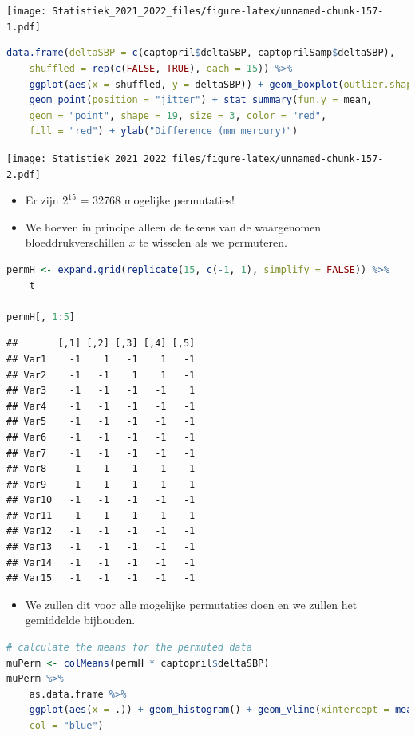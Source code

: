 \documentclass[
  12pt,dutch,coursenotes]{book}
\providecommand{\tightlist}{%
  \setlength{\itemsep}{0pt}\setlength{\parskip}{0pt}}
\theoremstyle{definition}
\theoremstyle{definition}
\theoremstyle{definition}
\theoremstyle{definition}
\theoremstyle{remark}
\begin{document}
\texttt{[image: Statistiek\_2021\_2022\_files/figure-latex/unnamed-chunk-157-1.pdf]}

\begin{lstlisting}[language=R]
data.frame(deltaSBP = c(captopril$deltaSBP, captoprilSamp$deltaSBP),
    shuffled = rep(c(FALSE, TRUE), each = 15)) %>%
    ggplot(aes(x = shuffled, y = deltaSBP)) + geom_boxplot(outlier.shape = NA) +
    geom_point(position = "jitter") + stat_summary(fun.y = mean,
    geom = "point", shape = 19, size = 3, color = "red",
    fill = "red") + ylab("Difference (mm mercury)")
\end{lstlisting}

\texttt{[image: Statistiek\_2021\_2022\_files/figure-latex/unnamed-chunk-157-2.pdf]}

\begin{itemize}
\tightlist
\item
  Er zijn \(2^{15}\) = 32768 mogelijke permutaties!
\item
  We hoeven in principe alleen de tekens van de waargenomen bloeddrukverschillen \(x\) te wisselen als we permuteren.
\end{itemize}

\begin{lstlisting}[language=R]
permH <- expand.grid(replicate(15, c(-1, 1), simplify = FALSE)) %>%
    t

permH[, 1:5]
\end{lstlisting}

\begin{lstlisting}
##       [,1] [,2] [,3] [,4] [,5]
## Var1    -1    1   -1    1   -1
## Var2    -1   -1    1    1   -1
## Var3    -1   -1   -1   -1    1
## Var4    -1   -1   -1   -1   -1
## Var5    -1   -1   -1   -1   -1
## Var6    -1   -1   -1   -1   -1
## Var7    -1   -1   -1   -1   -1
## Var8    -1   -1   -1   -1   -1
## Var9    -1   -1   -1   -1   -1
## Var10   -1   -1   -1   -1   -1
## Var11   -1   -1   -1   -1   -1
## Var12   -1   -1   -1   -1   -1
## Var13   -1   -1   -1   -1   -1
## Var14   -1   -1   -1   -1   -1
## Var15   -1   -1   -1   -1   -1
\end{lstlisting}

\begin{itemize}
\tightlist
\item
  We zullen dit voor alle mogelijke permutaties doen en we zullen het gemiddelde bijhouden.
\end{itemize}

\begin{lstlisting}[language=R]
# calculate the means for the permuted data
muPerm <- colMeans(permH * captopril$deltaSBP)
muPerm %>%
    as.data.frame %>%
    ggplot(aes(x = .)) + geom_histogram() + geom_vline(xintercept = mean(captopril$deltaSBP),
    col = "blue")
\end{lstlisting}
\end{document}
